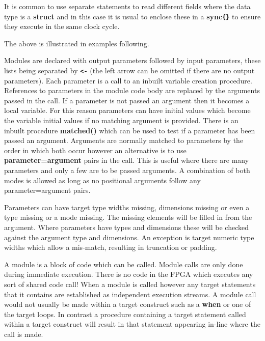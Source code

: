 \documentclass[10pt,a4paper,twoside,fleqn]{article}
\newcommand{\var}[1]{{\bf #1}} %
\begin{document}
    It is common to use separate statements to read different fields where
    the data type is a {\bf struct} and in this case it is usual to enclose these
    in a {\bf sync\verb'{}'} to ensure they execute in the same clock cycle.

    The above is illustrated in examples following.
    
    Modules are declared with output parameters followed by input parameters,
    these lists being separated by {\bf \verb'<-'} (the left arrow can be
    omitted if there are no output parameters). Each parameter is a call to
    an inbuilt variable creation procedure. References to parameters in
    the module code body are replaced by the arguments passed in the call.
    If a parameter is not passed an argument then it becomes a local variable.
    For this reason parameters can have initial values which become the 
    variable initial values if no matching argument is provided. There is
    an inbuilt procedure {\bf matched()} which can be used to test if a
    parameter has been passed an argument. Arguments are normally matched
    to parameters by the order in which both occur however an alternative
    is to use {\bf parameter=argument} pairs in the call. This is useful
    where there are many parameters and only a few are to be passed arguments.
    A combination of both modes is allowed as long as no positional arguments
    follow any parameter=argument pairs.
    
    Parameters can have target type widths missing, dimensions missing or
    even a type missing or a mode missing. The missing elements will be filled
    in from the argument. Where parameters have types and dimensions these
    will be checked against the argument type and dimensions. An exception
    is target numeric type widths which allow a mis-match, resulting in truncation
    or padding.
    
    A module is a block of code which can be called. Module calls are
    only done during immediate execution. There is no code in the FPGA which
    executes any sort of shared code call! When a module is called however
    any target statements that it contains are established as independent
    execution streams. A module call would not usually be made within a target
    construct such as a \var{when} or one of the target loops. In contrast
    a procedure containing a target statement called within a target construct
    will result in that statement appearing in-line where the call is made.
    
\end{document}

